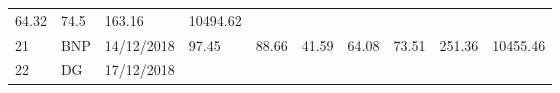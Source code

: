 \documentclass[
  11pt,
]{article}
\begin{document}
\begin{longtable}[]{@{}llllllllll@{}}
\begin{minipage}[t]{0.07\columnwidth}
64.32\strut
\end{minipage} & \begin{minipage}[t]{0.07\columnwidth}\raggedright
74.5\strut
\end{minipage} & \begin{minipage}[t]{0.08\columnwidth}\raggedright
163.16\strut
\end{minipage} & \begin{minipage}[t]{0.09\columnwidth}\raggedright
10494.62\strut
\end{minipage}\tabularnewline
\begin{minipage}[t]{0.05\columnwidth}\raggedright
21\strut
\end{minipage} & \begin{minipage}[t]{0.07\columnwidth}\raggedright
BNP\strut
\end{minipage} & \begin{minipage}[t]{0.11\columnwidth}\raggedright
14/12/2018\strut
\end{minipage} & \begin{minipage}[t]{0.07\columnwidth}\raggedright
97.45\strut
\end{minipage} & \begin{minipage}[t]{0.07\columnwidth}\raggedright
88.66\strut
\end{minipage} & \begin{minipage}[t]{0.07\columnwidth}\raggedright
41.59\strut
\end{minipage} & \begin{minipage}[t]{0.07\columnwidth}\raggedright
64.08\strut
\end{minipage} & \begin{minipage}[t]{0.07\columnwidth}\raggedright
73.51\strut
\end{minipage} & \begin{minipage}[t]{0.08\columnwidth}\raggedright
251.36\strut
\end{minipage} & \begin{minipage}[t]{0.09\columnwidth}\raggedright
10455.46\strut
\end{minipage}\tabularnewline
\begin{minipage}[t]{0.05\columnwidth}\raggedright
22\strut
\end{minipage} & \begin{minipage}[t]{0.07\columnwidth}\raggedright
DG\strut
\end{minipage} & \begin{minipage}[t]{0.11\columnwidth}\raggedright
17/12/2018\strut
\end{minipage} & \begin{minipage}[t]{0.07\columnwidth}\raggedright

\end{minipage}
\end{longtable}
\end{document}
